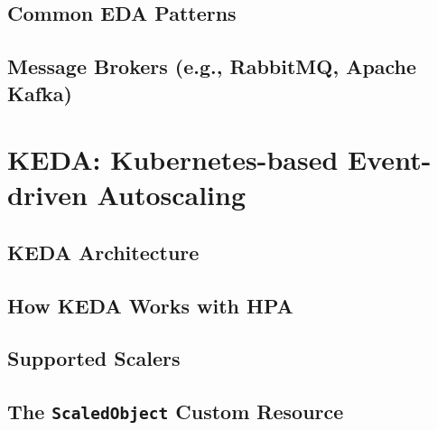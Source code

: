 \subsection{Common EDA Patterns}
\subsection{Message Brokers (e.g., RabbitMQ, Apache Kafka)}

\section{KEDA: Kubernetes-based Event-driven Autoscaling}
\subsection{KEDA Architecture}
\subsection{How KEDA Works with HPA}
\subsection{Supported Scalers}
\subsection{The \texttt{ScaledObject} Custom Resource} 